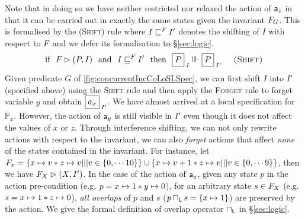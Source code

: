 Note that in doing so we have neither restricted nor relaxed the action of $\mathsf{a}_z$ in that it can be carried out in exactly the same states given the invariant $F_{G}$. This is formalised by the \textsc{(Shift)} rule where $I \sqsubseteq^{F_{}} I'$ denotes the shifting of $I$ with respect to $F_{}$ and we defer its formalisation to \S\ref{sec:logic}.
\[
	\text{if}\hspace*{0.25cm} \fence{} \fences (P, I) 
	\hspace*{0.25cm}\text{and}\hspace*{0.25cm} I \weakenI{\fence{}} I'
	\hspace*{0.25cm}\text{then}\hspace*{0.25cm}
	\shared{P}{I} \Vvdash \shared{P}{I'} \hspace*{0.5cm} \textsc{(Shift)}
\]
Given predicate $G$ of \fig\ref{fig:concurrentIncCoLoSLSpec}, we can first shift $I$ into $I'$ (specified above) using the \textsc{Shift} rule and then apply the \textsc{Forget} rule to forget variable $y$ and obtain $\shared{a_x}{I'}$.
We have almost arrived at a local specification for $\mathbb{P}_x$. However, the action of $\mathsf{a}_y$ is still visible in $I'$ even though it does not affect the values of $x$ or $z$. Through interference shifting, we can not only rewrite actions with respect to the invariant, we can also \emph{forget} actions that affect \emph{none} of the states contained in the invariant. For instance, let $F_{x} = \left\{x \mapsto v * z \mapsto v ||| v \in \{0, \cdots 10\} \right\} \cup \left\{x \mapsto v+1 * z \mapsto v ||| v \in \{0, \cdots 9 \} \right\}$, then we have $F_{X} \mathrel{\rhd} (X, I')$. In the case of the action of $\mathsf{a}_y$, given any state $p$ in the action pre-condition (e.g. $p = x \mapsto 1 * y \mapsto 0$), for an arbitrary state $s \in F_{X}$ (e.g. $s = x \mapsto 1 * z \mapsto 0$), \emph{all overlaps} of $p$ and $s$ ($p \sqcap_{\textsf{L}} s = \{x \mapsto 1\}$) are preserved by the action. We give the formal definition of overlap operator $\sqcap_{\textsf{L}}$ in \S\ref{sec:logic}. 

